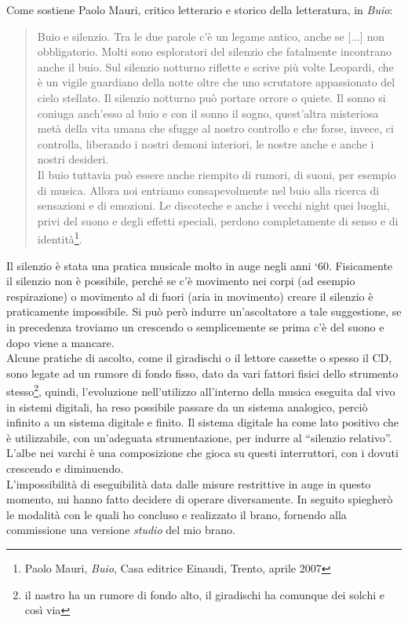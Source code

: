 Come sostiene Paolo Mauri, critico letterario e storico della letteratura, in \textit{Buio}:
\begin{quotation}
Buio e silenzio. Tra le due parole c’è un legame antico, anche se [...] non obbligatorio. Molti sono esploratori del silenzio che fatalmente incontrano anche il buio. Sul silenzio notturno riflette e scrive più volte Leopardi, che è un vigile guardiano della notte oltre che uno scrutatore appassionato del cielo stellato. Il silenzio notturno può portare orrore o quiete. Il sonno si coniuga anch’esso al buio e con il sonno il sogno, quest’altra misteriosa metà della vita umana che sfugge al nostro controllo e che forse, invece, ci controlla, liberando i nostri demoni interiori, le nostre anche e anche i nostri desideri. \\
Il buio tuttavia può essere anche riempito di rumori, di suoni, per esempio di musica. Allora noi entriamo consapevolmente nel buio alla ricerca di sensazioni e di emozioni. Le discoteche e anche i vecchi night quei luoghi, privi del suono e degli effetti speciali, perdono completamente di senso e di identità\footnote{Paolo Mauri, \textit{Buio}, Casa editrice Einaudi, Trento, aprile 2007}.
\end{quotation}
Il silenzio è stata una pratica musicale molto in auge negli anni ‘60. Fisicamente il silenzio non è possibile, perché se c’è movimento nei corpi (ad esempio respirazione) o movimento al di fuori (aria in movimento) creare il silenzio è praticamente impossibile. Si può però indurre un’ascoltatore a tale suggestione, se in precedenza troviamo un crescendo o semplicemente se prima c’è del suono e dopo viene a mancare. \\
Alcune pratiche di ascolto, come il giradischi o il lettore cassette o spesso il CD, sono legate ad un rumore di fondo fisso, dato da vari fattori fisici dello strumento stesso\footnote{il nastro ha un rumore di fondo alto, il giradischi ha comunque dei solchi e così via}, quindi, l’evoluzione nell’utilizzo all’interno della musica eseguita dal vivo in sistemi digitali, ha reso possibile passare da un sistema analogico, perciò infinito a un sistema digitale e finito. Il sistema digitale ha come lato positivo che è utilizzabile, con un’adeguata strumentazione, per indurre al “silenzio relativo”.
L’albe nei varchi è una composizione che gioca su questi interruttori, con i dovuti crescendo e diminuendo. \\
L'impossibilità di eseguibilità data dalle misure restrittive in auge in questo momento, mi hanno fatto decidere di operare diversamente. In seguito spiegherò le modalità con le quali ho concluso e realizzato il brano, fornendo alla commissione una versione \textit{studio} del mio brano. 

